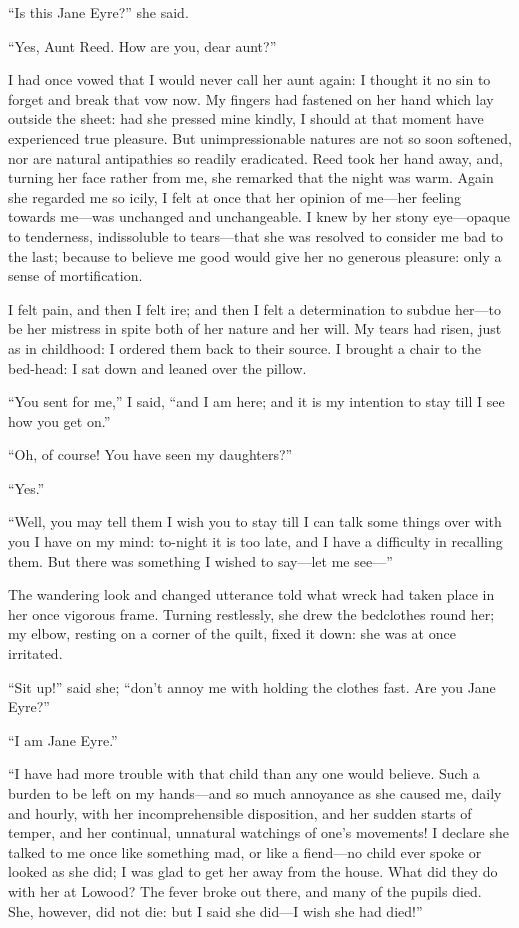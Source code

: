 \enquote{Is this Jane Eyre?} she said.

\enquote{Yes, Aunt Reed. How are you, dear aunt?}

I had once vowed that I would never call her aunt again: I thought it no
sin to forget and break that vow now. My fingers had fastened on her
hand which lay outside the sheet: had she pressed mine kindly, I should
at that moment have experienced true pleasure. But unimpressionable
natures are not so soon softened, nor are natural antipathies so readily
eradicated. \Mrs{} Reed took her hand away, and, turning her face rather
from me, she remarked that the night was warm. Again she regarded me so
icily, I felt at once that her opinion of me---her feeling towards
me---was unchanged and unchangeable. I knew by her stony eye---opaque
to tenderness, indissoluble to tears---that she was resolved to consider
me bad to the last; because to believe me good would give her no
generous pleasure: only a sense of mortification.

I felt pain, and then I felt ire; and then I felt a determination to
subdue her---to be her mistress in spite both of her nature and her
will. My tears had risen, just as in childhood: I ordered them back to
their source. I brought a chair to the bed-head: I sat down and leaned
over the pillow.

\enquote{You sent for me,} I said, \enquote{and I am here; and it is my
	intention to stay till I see how you get on.}

\enquote{Oh, of course! You have seen my daughters?}

\enquote{Yes.}

\enquote{Well, you may tell them I wish you to stay till I can talk some
	things over with you I have on my mind: to-night it is too late, and I
	have a difficulty in recalling them. But there was something I wished
	to say---let me see---}

The wandering look and changed utterance told what wreck had taken place
in her once vigorous frame. Turning restlessly, she drew the bedclothes
round her; my elbow, resting on a corner of the quilt, fixed it down:
she was at once irritated.

\enquote{Sit up!} said she; \enquote{don't annoy me with holding the
	clothes fast. Are you Jane Eyre?}

\enquote{I am Jane Eyre.}

\enquote{I have had more trouble with that child than any one would
	believe. Such a burden to be left on my hands---and so much annoyance
	as she caused me, daily and hourly, with her incomprehensible
	disposition, and her sudden starts of temper, and her continual,
	unnatural watchings of one's movements! I declare she talked to me once
	like something mad, or like a fiend---no child ever spoke or looked as
	she did; I was glad to get her away from the house. What did they do
	with her at Lowood? The fever broke out there, and many of the pupils
	died. She, however, did not die: but I said she did---I wish she had
	died!}

